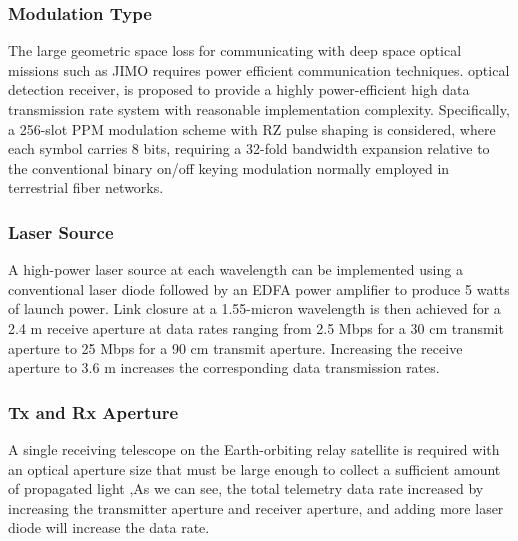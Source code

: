 \subsubsection{Modulation Type}

The large geometric space loss for communicating with deep space optical missions such as JIMO requires power efficient communication techniques.
optical detection receiver, is proposed to provide a highly power-efficient high data transmission rate system with reasonable implementation complexity. Specifically, a 256-slot PPM modulation scheme with RZ pulse shaping is considered, where each symbol carries 8 bits, requiring a 32-fold bandwidth expansion relative to the conventional binary on/off keying modulation normally employed in terrestrial fiber networks.

\subsubsection{Laser Source}

A high-power laser source at each wavelength can be implemented using a conventional laser diode followed by an EDFA power amplifier to produce 5 watts of launch power. Link closure at a 1.55-micron wavelength is then achieved for a 2.4 m receive aperture at data rates ranging from 2.5 Mbps for a 30 cm transmit aperture to 25 Mbps for a 90 cm transmit aperture. Increasing the receive aperture to 3.6 m increases the corresponding data transmission rates.

\subsubsection{Tx and Rx Aperture}

A single receiving telescope on the Earth-orbiting relay satellite is required with an optical aperture size that must be large enough to collect a sufficient amount of propagated light ,As we can see, the total telemetry data rate increased by increasing the transmitter aperture and receiver aperture, and adding more laser diode will increase the data rate. 

